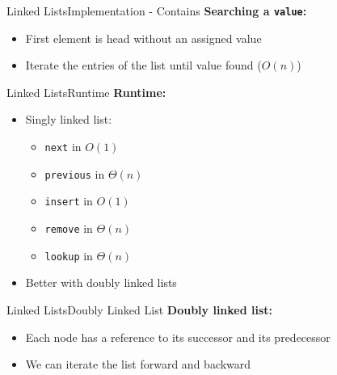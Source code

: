 
\begin{frame}[fragile]{Linked Lists}{Implementation - Contains}
  \textbf{Searching a \texttt{value}:}
  \begin{itemize}
    \item<2->
      First element is head without an assigned value
    \item<3->
      Iterate the entries of the list until value found ($O(n)$)
      
  \end{itemize}
\end{frame}


\begin{frame}{Linked Lists}{Runtime}
  \textbf{Runtime:}
  \begin{itemize}
    \item<2->
      Singly linked list:
      \begin{itemize}
        \item<3-> {\color{Mittel-Blau}\texttt{next}} in $O(1)$
        \item<4-> {\color{Mittel-Blau}\texttt{previous}} in $\Theta(n)$
        \item<5-> {\color{Mittel-Blau}\texttt{insert}} in $O(1)$
        \item<6-> {\color{Mittel-Blau}\texttt{remove}} in $\Theta(n)$
        \item<7-> {\color{Mittel-Blau}\texttt{lookup}} in $\Theta(n)$
      \end{itemize}
    \item<8->
      Better with {\color{Mittel-Blau}doubly linked lists}
  \end{itemize}
\end{frame}


\begin{frame}{Linked Lists}{Doubly Linked List}
  \textbf{Doubly linked list:}
  \begin{itemize}
    \item<2->
      Each node has a reference to its successor and its
      {\color{Mittel-Blau}predecessor}
    \item<3->
      We can iterate the list forward and backward
  \end{itemize}
  \begin{flushleft}
    
  \end{flushleft}
\end{frame}

